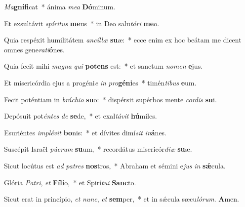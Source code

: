 \item \textit{Ma}\textbf{gní}\textbf{fi}cat~* ánima \textit{mea} \textbf{Dó}minum.

\item Et exsultávit \textit{spíritus} \textbf{me}us~* in Deo salu\textit{tári} \textbf{me}o.

\item Quia respéxit humilitátem \textit{ancíllæ} \textbf{su}æ:~* ecce enim ex hoc beátam me dicent omnes gene\textit{rati}\textbf{ó}nes.

\item Quia fecit mihi \textit{magna} \textit{qui} \textbf{pot}\textbf{ens} est:~* et sanctum \textit{nomen} \textbf{e}jus.

\item Et misericórdia ejus a progéni\textit{e} \textit{in} \textit{pro}\textbf{gé}\textbf{ni}es~* timén\textit{tibus} \textbf{e}um.

\item Fecit poténtiam in \textit{bráchio} \textbf{su}o:~* dispérsit supérbos mente \textit{cordis} \textbf{su}i.

\item Depósuit pot\textit{éntes} \textit{de} \textbf{se}de,~* et exal\textit{távit} \textbf{hú}miles.

\item Esuriéntes \textit{implévit} \textbf{bo}nis:~* et dívites dimí\textit{sit} \textit{in}\textbf{á}nes.

\item Suscépit Israël \textit{púerum} \textbf{su}um,~* recordátus misericór\textit{diæ} \textbf{su}æ.

\item Sicut locútus est \textit{ad} \textit{patres} \textbf{nos}tros,~* Abraham et sémini e\textit{jus} \textit{in} \textbf{sǽ}cula.

\item Glória \textit{Patri}, \textit{et} \textbf{Fí}\textbf{li}o,~* et Spirí\textit{tui} \textbf{Sanc}to.

\item Sicut erat in princípio, \textit{et} \textit{nunc}, \textit{et} \textbf{sem}per,~* et in sǽcula sæcu\textit{lórum}. \textbf{A}men.
